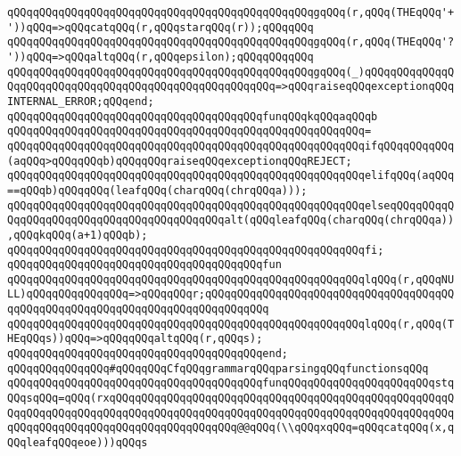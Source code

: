 \verb|qQQqqQQqqQQqqQQqqQQqqQQqqQQqqQQqqQQqqQQqqQQqqQQqgqQQq(r,qQQq(THEqQQq'+'))qQQq=>qQQqcatqQQq(r,qQQqstarqQQq(r));qQQqqQQq|\newline
\verb|qQQqqQQqqQQqqQQqqQQqqQQqqQQqqQQqqQQqqQQqqQQqqQQqgqQQq(r,qQQq(THEqQQq'?'))qQQq=>qQQqaltqQQq(r,qQQqepsilon);qQQqqQQqqQQq|\newline
\verb|qQQqqQQqqQQqqQQqqQQqqQQqqQQqqQQqqQQqqQQqqQQqqQQqgqQQq(_)qQQqqQQqqQQqqQQqqQQqqQQqqQQqqQQqqQQqqQQqqQQqqQQqqQQqqQQq=>qQQqraiseqQQqexceptionqQQqINTERNAL_ERROR;qQQqend;|\newline
\newline
\verb|qQQqqQQqqQQqqQQqqQQqqQQqqQQqqQQqqQQqqQQqfunqQQqkqQQqaqQQqb|\newline
\verb|qQQqqQQqqQQqqQQqqQQqqQQqqQQqqQQqqQQqqQQqqQQqqQQqqQQqqQQq=|\newline
\verb|qQQqqQQqqQQqqQQqqQQqqQQqqQQqqQQqqQQqqQQqqQQqqQQqqQQqqQQqifqQQqqQQqqQQq(aqQQq>qQQqqQQqb)qQQqqQQqraiseqQQqexceptionqQQqREJECT;|\newline
\verb|qQQqqQQqqQQqqQQqqQQqqQQqqQQqqQQqqQQqqQQqqQQqqQQqqQQqqQQqelifqQQq(aqQQq==qQQqb)qQQqqQQq(leafqQQq(charqQQq(chrqQQqa)));|\newline
\verb|qQQqqQQqqQQqqQQqqQQqqQQqqQQqqQQqqQQqqQQqqQQqqQQqqQQqqQQqelseqQQqqQQqqQQqqQQqqQQqqQQqqQQqqQQqqQQqqQQqqQQqalt(qQQqleafqQQq(charqQQq(chrqQQqa)),qQQqkqQQq(a+1)qQQqb);|\newline
\verb|qQQqqQQqqQQqqQQqqQQqqQQqqQQqqQQqqQQqqQQqqQQqqQQqqQQqqQQqfi;|\newline
\newline
\verb|qQQqqQQqqQQqqQQqqQQqqQQqqQQqqQQqqQQqqQQqfun|\newline
\verb|qQQqqQQqqQQqqQQqqQQqqQQqqQQqqQQqqQQqqQQqqQQqqQQqqQQqqQQqlqQQq(r,qQQqNULL)qQQqqQQqqQQqqQQq=>qQQqqQQqr;qQQqqQQqqQQqqQQqqQQqqQQqqQQqqQQqqQQqqQQqqQQqqQQqqQQqqQQqqQQqqQQqqQQqqQQqqQQqqQQq|\newline
\verb|qQQqqQQqqQQqqQQqqQQqqQQqqQQqqQQqqQQqqQQqqQQqqQQqqQQqqQQqlqQQq(r,qQQq(THEqQQqs))qQQq=>qQQqqQQqaltqQQq(r,qQQqs);|\newline
\verb|qQQqqQQqqQQqqQQqqQQqqQQqqQQqqQQqqQQqqQQqend;|\newline
\newline
\newline
\verb|qQQqqQQqqQQqqQQq#qQQqqQQqCfqQQqgrammarqQQqparsingqQQqfunctionsqQQq|\newline
\newline
\verb|qQQqqQQqqQQqqQQqqQQqqQQqqQQqqQQqqQQqqQQqfunqQQqqQQqqQQqqQQqqQQqqQQqstqQQqsqQQq=qQQq(rxqQQqqQQqqQQqqQQqqQQqqQQqqQQqqQQqqQQqqQQqqQQqqQQqqQQqqQQqqQQqqQQqqQQqqQQqqQQqqQQqqQQqqQQqqQQqqQQqqQQqqQQqqQQqqQQqqQQqqQQqqQQqqQQqqQQqqQQqqQQqqQQqqQQqqQQqqQQqqQQq@@qQQq(\\qQQqxqQQq=qQQqcatqQQq(x,qQQqleafqQQqeoe)))qQQqs|\newline
